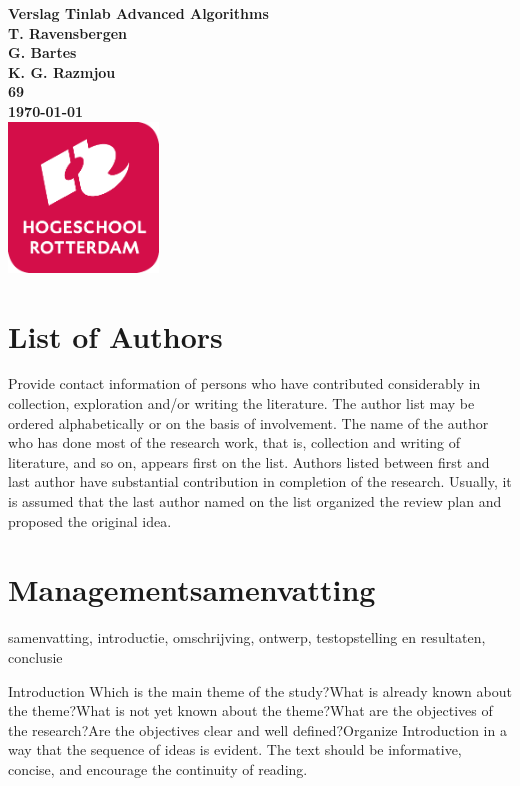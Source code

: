 \documentclass{article}
\begin{document}
	\sffamily
	\begin{titlepage}
		\centering
		\vfill
		{\bfseries\Huge
			Verslag Tinlab Advanced Algorithms \\
			\vskip2cm
		}
		{\bfseries\Large
			T. Ravensbergen\\ 
			G. Bartes\\
			K. G. Razmjou\\
		}
		{
			\bfseries\normalsize
			69\\
			\vskip1cm
			\today\\
		}    
		\vfill
		\includegraphics[width=4cm]{logohr.png} %
		\vfill
		\vfill
	\end{titlepage}
\newpage
\chapter{List of Authors}


Provide contact information of persons who have contributed considerably in collection, exploration and/or writing the literature.
The author list may be ordered alphabetically or on the basis of involvement. The name of the author who has done most of the research work, that is, collection and writing of literature, and so on, appears first on the list. Authors listed between first and last author have substantial contribution in completion of the research. Usually, it is assumed that the last author named on the list organized the review plan and proposed the original idea.


\newpage
\chapter{Managementsamenvatting}
samenvatting, introductie, omschrijving, ontwerp, testopstelling en resultaten, conclusie 

Introduction
Which is the main theme of the study?What is already known about the theme?What is not yet known about the theme?What are the objectives of the research?Are the objectives clear and well defined?Organize  Introduction  in  a  way  that  the  sequence  of  ideas  is  evident. The text should be informative, concise, and encourage the continuity of reading. 
\end{document}

